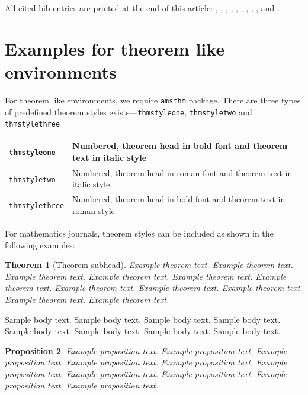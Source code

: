 \documentclass[pdflatex,sn-mathphys-num]{sn-jnl}%
\theoremstyle{thmstyleone}%
\newtheorem{theorem}{Theorem}%
\newtheorem{proposition}[theorem]{Proposition}%
\theoremstyle{thmstyletwo}%
\theoremstyle{thmstylethree}%
\begin{document}
All cited bib entries are printed at the end of this article: \cite{bib3}, \cite{bib4}, \cite{bib5}, \cite{bib6}, \cite{bib7}, \cite{bib8}, \cite{bib9}, \cite{bib10}, \cite{bib11}, \cite{bib12} and \cite{bib13}.

\section{Examples for theorem like environments}\label{sec10}

For theorem like environments, we require \verb+amsthm+ package. There are three types of predefined theorem styles exists---\verb+thmstyleone+, \verb+thmstyletwo+ and \verb+thmstylethree+ 

\bigskip
\begin{tabular}{|l|p{19pc}|}
\hline
\verb+thmstyleone+ & Numbered, theorem head in bold font and theorem text in italic style \\\hline
\verb+thmstyletwo+ & Numbered, theorem head in roman font and theorem text in italic style \\\hline
\verb+thmstylethree+ & Numbered, theorem head in bold font and theorem text in roman style \\\hline
\end{tabular}
\bigskip

For mathematics journals, theorem styles can be included as shown in the following examples:

\begin{theorem}[Theorem subhead]\label{thm1}
Example theorem text. Example theorem text. Example theorem text. Example theorem text. Example theorem text. 
Example theorem text. Example theorem text. Example theorem text. Example theorem text. Example theorem text. 
Example theorem text. 
\end{theorem}

Sample body text. Sample body text. Sample body text. Sample body text. Sample body text. Sample body text. Sample body text. Sample body text.

\begin{proposition}
Example proposition text. Example proposition text. Example proposition text. Example proposition text. Example proposition text. 
Example proposition text. Example proposition text. Example proposition text. Example proposition text. Example proposition text. 
\end{proposition}
\end{document}
